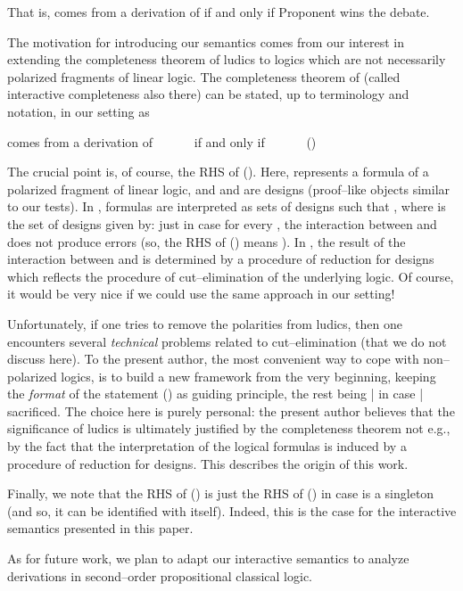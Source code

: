 \documentclass[copyright,creativecommons]{eptcs}
\def\eg{e.g., }
\newcommand{\cM}{\mathcal{M}}
\newcommand{\cT}{\mathcal{T}}
\newcommand{\bS}{\mathbf{S}}
\theoremstyle{definition}
\newcommand{\squishlist}{
 \begin{list}{}
  { \setlength{\itemsep}{0pt}
     \setlength{\parsep}{3pt}
     \setlength{\topsep}{3pt}
     \setlength{\partopsep}{0pt}
     \setlength{\leftmargin}{1em}
     \setlength{\labelwidth}{1.5em}
     \setlength{\labelsep}{0.5em} } }
\newcommand{\squishend}{
  \end{list}  }
\begin{document}
\noindent That is,  comes from a derivation  of  if and only if Proponent wins the debate.

The motivation for introducing our semantics comes
from our interest   in extending
the completeness theorem of ludics \cite{locus} to logics which
are not necessarily polarized fragments of linear logic.
 The completeness theorem of \cite{BT}
(called interactive completeness also there) can be stated, up to terminology and notation, in our setting as
\vspace{-0.1cm}
\squishlist
\item[] {\centering
 comes from a derivation  of  \ \ \ \ \ \ if and only if \ \ \ \ \ \ \cM \in \neg \bS\cT\cM \hfill () \par}
\squishend
The crucial point is, of course,
the RHS of ().
Here,  represents a formula of a polarized fragment of linear logic, and  and  are designs
(proof--like objects similar to our tests).
In \cite{BT}, formulas
are interpreted as sets of designs such that  , where  is the set
of designs given by:  
just in case for every , the interaction between   and 
does not produce errors (so, the RHS of () means ).
In \cite{BT},  the result of the interaction between  and    is determined by a procedure of reduction for designs which reflects the procedure of cut--elimination of the underlying logic.
Of course, it would be very nice if we could
use the same approach  in our setting!

Unfortunately, if one tries
to remove the polarities from  ludics, then one encounters
several \emph{technical} problems
related to cut--elimination (that we do not discuss here).
To the present author, the
most convenient way to cope with non--polarized logics, is to build
a new framework from the very beginning, keeping the \emph{format} of the statement () as guiding principle, the rest being | in case |  sacrificed.
The  choice here is purely personal:
the present author believes that
the significance of ludics is ultimately justified by the  completeness theorem not \eg
by the fact that   the interpretation of the logical formulas is induced by a procedure of reduction for designs.
This describes the origin of this work.

Finally, we note that
the RHS of ()
is just the  RHS of () in case  is a singleton
(and so, it can be identified with
 itself). Indeed, this is the case for the interactive semantics presented in this
paper.


As for future work, we plan to adapt our interactive  semantics to analyze derivations in
second--order propositional classical logic.\\
\end{document}
